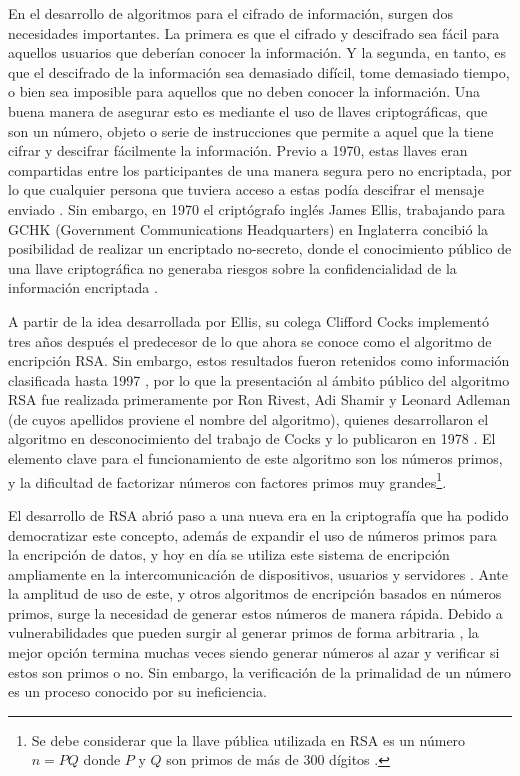 \documentclass[hidelinks, 12pt]{article}
\begin{document}
En el desarrollo de algoritmos para el cifrado de información, surgen dos necesidades importantes. La primera es que el cifrado y descifrado sea fácil para aquellos usuarios que deberían conocer la información. Y la segunda, en tanto, es que el descifrado de la información sea demasiado difícil, tome demasiado tiempo, o bien sea imposible para aquellos que no deben conocer la información. Una buena manera de asegurar esto es mediante el uso de llaves criptográficas, que son un número, objeto o serie de instrucciones que permite a aquel que la tiene cifrar y descifrar fácilmente la información. Previo a 1970, estas llaves eran compartidas entre los participantes de una manera segura pero no encriptada, por lo que cualquier persona que tuviera acceso a estas podía descifrar el mensaje enviado \cite{ZDNet}. Sin embargo, en 1970 el criptógrafo inglés James Ellis, trabajando para GCHK (Government Communications Headquarters) en Inglaterra concibió la posibilidad de realizar un encriptado no-secreto, donde el conocimiento público de una llave criptográfica no generaba riesgos sobre la confidencialidad de la información encriptada \cite{NSarchive}.

A partir de la idea desarrollada por Ellis, su colega Clifford Cocks implementó tres años después el predecesor de lo que ahora se conoce como el algoritmo de encripción RSA. Sin embargo, estos resultados fueron retenidos como información clasificada hasta 1997 \cite{Bristol}, por lo que la presentación al ámbito público del algoritmo RSA fue realizada primeramente por Ron Rivest, Adi Shamir y Leonard Adleman (de cuyos apellidos proviene el nombre del algoritmo), quienes desarrollaron el algoritmo en desconocimiento del trabajo de Cocks y lo publicaron en 1978 \cite{RSA}. El elemento clave para el funcionamiento de este algoritmo son los números primos, y la dificultad de factorizar números con factores primos muy grandes\footnote{Se debe considerar que la llave pública utilizada en RSA es un número $n=PQ$ donde $P$ y $Q$ son primos de más de 300 dígitos \cite{Entro}.}.

El desarrollo de RSA abrió paso a una nueva era en la criptografía que ha podido democratizar este concepto, además de expandir el uso de números primos para la encripción de datos, y hoy en día se utiliza este sistema de encripción ampliamente en la intercomunicación de dispositivos, usuarios y servidores \cite{Entro}. Ante la amplitud de uso de este, y otros algoritmos de encripción basados en números primos, surge la necesidad de generar estos números de manera rápida. Debido a vulnerabilidades que pueden surgir al generar primos de forma arbitraria \cite{Blog}, la mejor opción termina muchas veces siendo generar números al azar y verificar si estos son primos o no. Sin embargo, la verificación de la primalidad de un número es un proceso conocido por su ineficiencia. 
\end{document}
